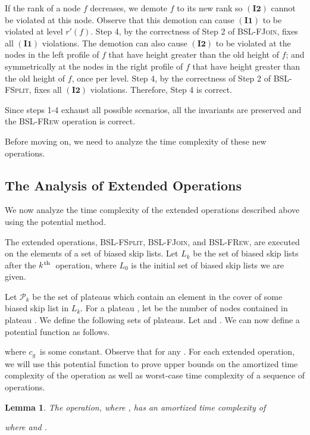 \documentclass[11pt]{article}
\newcommand{\ens}[1]{\ensuremath{#1}}
\newcommand{\kth}{\ens{k^{ \mbox{\hspace{.2mm}\scriptsize th}}}}
\newcommand{\Bslfspl}{\mbox{\textsc{BSL-FSplit}}}
\newcommand{\Bslfjoin}{\mbox{\textsc{BSL-FJoin}}}
\newcommand{\Bslfrew}{\mbox{\textsc{BSL-FRew}}}
\newcommand{\cons}[1]{\ensuremath{c_{#1}}}
\newcommand{\cnsg}{\cons g}
\newcommand{\invone}{\ensuremath{\mathbf{(I1)}}}
\newcommand{\invtwo}{\ensuremath{\mathbf{(I2)}}}
\newcommand{\nodenewrank}[1]{\ensuremath{r'(\node #1)}}
\newcommand{\node}[1]{\ensuremath{#1}}
\newcommand{\indatast}[1]{\ensuremath{L_{#1}}}
\newcommand{\plats}[1]{\ensuremath{\mathcal P_{#1}}}
\newcounter{count}
\newtheorem{lemma}[count]{Lemma}
\begin{document}
If the rank of a node \node f decreases, we demote \node f to its new rank so \invtwo{} cannot be violated at this node. Observe that this demotion can cause \invone{} to be violated at level \nodenewrank f. Step 4, by the correctness of Step 2 of \Bslfjoin{}, fixes all \invone{} violations. The demotion can also cause \invtwo{} to be violated at the nodes in the left profile of \node f that have height greater than the old height of \node f; and symmetrically at the nodes in the right profile of \node f that have height greater than the old height of \node f, once per level. Step 4, by the correctness of Step 2 of \Bslfspl{}, fixes all \invtwo{} violations. Therefore, Step 4 is correct. 

Since steps 1-4 exhaust all possible scenarios, all the invariants are preserved and the \Bslfrew{} operation is correct. 



Before moving on, we need to analyze the time complexity of these new operations. 


\subsection{The Analysis of Extended Operations} 
\label{subsec:BSLAnalysisExtOps} 



We now analyze the time complexity of the extended operations described above using the potential method. 



The extended operations, \Bslfspl{}, \Bslfjoin{}, and \Bslfrew{}, are executed on the elements of a set of biased skip lists. Let \indatast k be the set of biased skip lists after the \kth\ operation, where \indatast 0 is the initial set of biased skip lists we are given. 

Let \plats k be the set of plateaus which contain an element in the cover of some biased skip list in \indatast{k}. For a plateau , let  be the number of nodes contained in plateau . We define the following sets of plateaus. Let  and . 
We can now define a potential function as follows. 
 
where \cnsg\ is some constant. Observe that  for any . 
For each extended operation, we will use this potential function to prove upper bounds on the amortized time complexity of the operation as well as worst-case time complexity of a sequence of operations. 


\begin{lemma} 
\label{lem:costofbslfsplit} 
The  operation, where , has an amortized time complexity of 
 
where  and . 
\end{lemma} 
\end{document}
